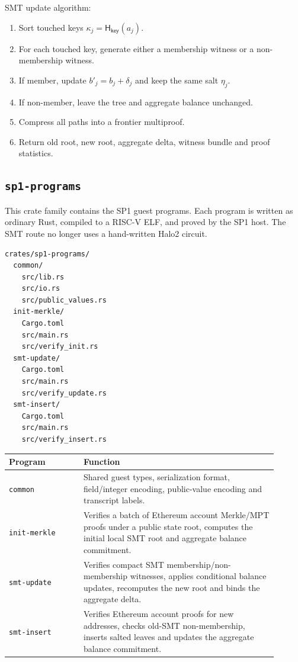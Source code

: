 \documentclass[UTF8,a4paper,11pt]{ctexart}
\newcommand{\Hash}{\mathsf H}
\begin{document}
SMT update algorithm:
\begin{enumerate}[leftmargin=2em]
  \item Sort touched keys $\kappa_j=\Hash_{\mathsf{key}}(a_j)$.
  \item For each touched key, generate either a membership witness or a non-membership witness.
  \item If member, update $b'_j=b_j+\delta_j$ and keep the same salt $\eta_j$.
  \item If non-member, leave the tree and aggregate balance unchanged.
  \item Compress all paths into a frontier multiproof.
  \item Return old root, new root, aggregate delta, witness bundle and proof statistics.
\end{enumerate}


\subsection{\texttt{sp1-programs}}

This crate family contains the SP1 guest programs. Each program is written as ordinary Rust, compiled to a RISC-V ELF, and proved by the SP1 host. The SMT route no longer uses a hand-written Halo2 circuit.

\begin{lstlisting}
crates/sp1-programs/
  common/
    src/lib.rs
    src/io.rs
    src/public_values.rs
  init-merkle/
    Cargo.toml
    src/main.rs
    src/verify_init.rs
  smt-update/
    Cargo.toml
    src/main.rs
    src/verify_update.rs
  smt-insert/
    Cargo.toml
    src/main.rs
    src/verify_insert.rs
\end{lstlisting}

\begin{longtable}{p{0.25\linewidth}p{0.65\linewidth}}
\toprule
Program & Function \\
\midrule
\texttt{common} & Shared guest types, serialization format, field/integer encoding, public-value encoding and transcript labels. \\
\texttt{init-merkle} & Verifies a batch of Ethereum account Merkle/MPT proofs under a public state root, computes the initial local SMT root and aggregate balance commitment. \\
\texttt{smt-update} & Verifies compact SMT membership/non-membership witnesses, applies conditional balance updates, recomputes the new root and binds the aggregate delta. \\
\texttt{smt-insert} & Verifies Ethereum account proofs for new addresses, checks old-SMT non-membership, inserts salted leaves and updates the aggregate balance commitment. \\
\bottomrule
\end{longtable}
\end{document}
